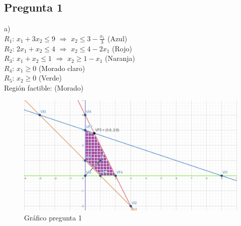 \documentclass{article}
\begin{document}
	
	\begin{flushleft}
		
		\section{Pregunta 1}
		a) \\
		$R_1$: $x_1 + 3x_2 \leq 9$ $\Rightarrow$ $x_2 \leq 3-\frac{x_1}{3} $ (Azul)\\
		$R_2$: $2x_1 + x_2 \leq 4$ $\Rightarrow$ $x_2 \leq 4-2x_1$ (Rojo)\\
		$R_3$: $x_1 + x_2 \leq 1$ $\Rightarrow$ $x_2 \geq 1-x_1 $ (Naranja)\\
		$R_4$: $x_1 \geq 0$ (Morado claro)\\
		$R_5$: $x_2 \geq 0$ (Verde)\\
		Región factible: (Morado)
		
		\vspace{0.5cm}

		\begin{figure}[ht]
			\centering
			\includegraphics[width=1.1\textwidth]{grafico1.jpg}
			\caption{Gráfico pregunta 1}
			\label{fig:grafico}
		\end{figure}

		\newpage


\end{flushleft}
\end{document}
